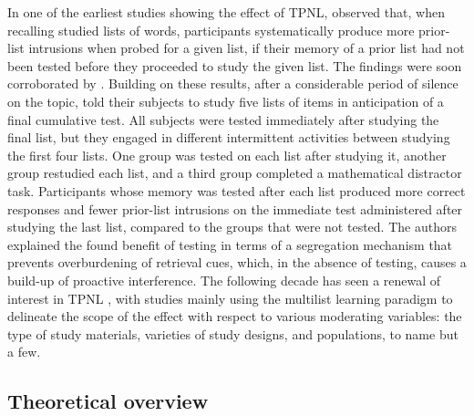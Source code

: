 \documentclass[../main.tex]{subfiles}
\begin{document}
In one of the earliest studies showing the effect of TPNL, \cite{darleyEffectsPriorFree1971} observed that, when recalling studied lists of words, participants systematically produce more prior-list intrusions when probed for a given list, if their memory of a prior list had not been tested before they proceeded to study the given list. The findings were soon corroborated by \cite{tulvingNegativeTransferEffects1974}. Building on these results, after a considerable period of silence on the topic, \cite{szpunarTestingStudyInsulates2008} told their subjects to study five lists of items in anticipation of a final cumulative test. All subjects were tested immediately after studying the final list, but they engaged in different intermittent activities between studying the first four lists. One group was tested on each list after studying it, another group restudied each list, and a third group completed a mathematical distractor task. Participants whose memory was tested after each list produced more correct responses and fewer prior-list intrusions on the immediate test administered after studying the last list, compared to the groups that were not tested. The authors explained the found benefit of testing in terms of a segregation mechanism that prevents overburdening of retrieval cues, which, in the absence of testing, causes a build-up of proactive interference. The following decade has seen a renewal of interest in TPNL \citep{chanRetrievalPotentiatesNew2018, pastotterRetrievalPracticeEnhances2014, yangEnhancingLearningRetrieval2018}, with studies mainly using the multilist learning paradigm to delineate the scope of the effect with respect to various moderating variables: the type of study materials, varieties of study designs, and populations, to name but a few. 

\subsection*{Theoretical overview}
\end{document}
